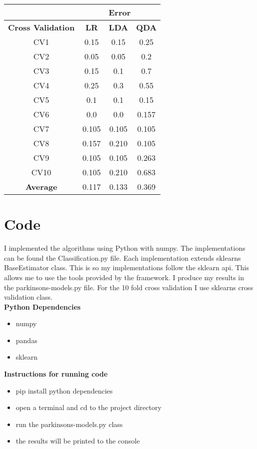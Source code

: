 \begin{center}
    \begin{tabular}{|c|c|c|c|}
        \hline
            \multicolumn{1}{|r|}{} & \multicolumn{3}{|c|}{Error} \\
        \hline
        \textbf{Cross Validation} & \textbf{LR} & \textbf{LDA} & \textbf{QDA} \\
        \hline
        CV1 & 0.15 & 0.15 & 0.25 \\
        \hline
        CV2 & 0.05 & 0.05 & 0.2 \\
        \hline
        CV3 & 0.15 & 0.1 & 0.7 \\
        \hline 
        CV4 & 0.25 & 0.3 & 0.55 \\
        \hline 
        CV5 & 0.1 & 0.1 & 0.15 \\
        \hline
        CV6 & 0.0 & 0.0 & 0.157 \\
        \hline 
        CV7 & 0.105 & 0.105 & 0.105 \\
        \hline 
        CV8 & 0.157 & 0.210 & 0.105 \\
        \hline
        CV9 & 0.105 & 0.105 & 0.263 \\
        \hline
        CV10 & 0.105 & 0.210 & 0.683 \\
        \hline
        \textbf{Average} & 0.117 & 0.133 & 0.369 \\
        \hline
    \end{tabular}
\end{center}


\section{Code}
I implemented the algorithms using Python with numpy.
The implementations can be found the Classification.py file. 
Each implementation extends sklearns BaseEstimator class. 
This is so my implementations follow the sklearn api.
This allows me to use the tools provided by the framework.
I produce my results in the parkinsons-models.py file.
For the 10 fold cross validation I use sklearns cross validation class.\\
\textbf{Python Dependencies}
\begin{itemize}
    \item numpy
    \item pandas
    \item sklearn
\end{itemize}
\textbf{Instructions for running code}
\begin{itemize}
    \item pip install python dependencies
    \item open a terminal and cd to the project directory
    \item run the parkinsons-models.py class
    \item the results will be printed to the console
\end{itemize}
